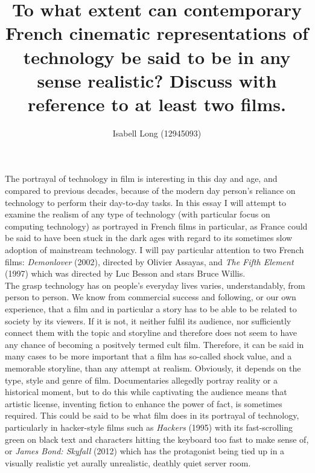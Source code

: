\documentclass[12pt,a4paper]{article}
\begin{document}
\title{To what extent can contemporary French cinematic
       representations of technology be said to be in any sense
       realistic? Discuss with reference to at least two films.}
\author{Isabell Long (12945093)}
\maketitle

The portrayal of technology in film is interesting in this day and
age, and compared to previous decades, because of the modern day
person's reliance on technology to perform their day-to-day tasks. In
this essay I will attempt to examine the realism of any type of
technology (with particular focus on computing technology) as
portrayed in French films in particular, as France could be said to
have been stuck in the dark ages with regard to its sometimes slow
adoption of mainstream technology. I will pay particular attention to
two French films: \textit{Demonlover} (2002), directed by Olivier
Assayas, and \textit{The Fifth Element} (1997) which was directed by
Luc Besson and stars Bruce Willis.\\

The grasp technology has on people's everyday lives varies,
understandably, from person to person. We know from commercial success
and following, or our own experience, that a film and in particular a
story has to be able to be related to society by its viewers. If it is
not, it neither fulfil its audience, nor sufficiently connect them
with the topic and storyline and therefore does not seem to have any
chance of becoming a positvely termed cult film. Therefore, it can be
said in many cases to be more important that a film has so-called
shock value, and a memorable storyline, than any attempt at realism.
Obviously, it depends on the type, style and genre of film.
Documentaries allegedly portray reality or a historical moment, but to
do this while captivating the audience means that artistic license,
inventing fiction to enhance the power of fact, is sometimes required.
This could be said to be what film does in its portrayal of
technology, particularly in hacker-style films such as
\textit{Hackers} (1995) with its fast-scrolling green on black text
and characters hitting the keyboard too fast to make sense of, or
\textit{James Bond: Skyfall} (2012) which has the protagonist being
tied up in a visually realistic yet aurally unrealistic, deathly quiet
server room.\\
\end{document}
